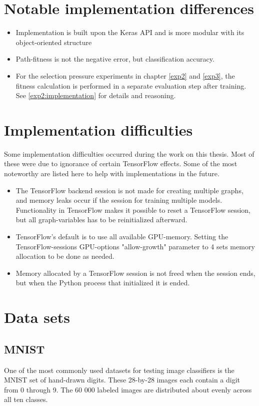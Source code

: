 \section{Notable implementation differences}
\begin{itemize}
    \item Implementation is built upon the Keras API and is more modular with its object-oriented structure
    \item Path-fitness is not the negative error, but classification accuracy. 
    \item For the selection pressure experiments in chapter \ref{exp2} and \ref{exp3}, the fitness calculation is performed in a separate evaluation step after training. See \ref{exp2:implementation} for details and reasoning.
\end{itemize}

\section{Implementation difficulties} 
\label{implementation:problems}
Some implementation difficulties occurred during the work on this thesis. Most of these were due to ignorance of certain TensorFlow effects. Some of the most noteworthy are listed here to help with implementations in the future.
\begin{itemize}
    \item The TensorFlow backend session is not made for creating multiple graphs, and memory leaks occur if the session for training multiple models. Functionality in TensorFlow makes it possible to reset a TensorFlow session, but all graph-variables has to be reinitialized afterward. 
    \item TensorFlow's default is to use all available GPU-memory. Setting the TensorFlow-sessions GPU-options "allow-growth" parameter to 4 sets memory allocation to be done as needed.
    \item Memory allocated by a TensorFlow session is not freed when the session ends, but when the Python process that initialized it is ended.
\end{itemize}

\section{Data sets}
\subsection{MNIST}\label{Implementation:MNIST}
One of the most commonly used datasets for testing image classifiers is the MNIST\cite{MNIST} set of hand-drawn digits. These 28-by-28 images each contain a digit from 0 through 9. The 60 000 labeled images are distributed about evenly across all ten classes. 

